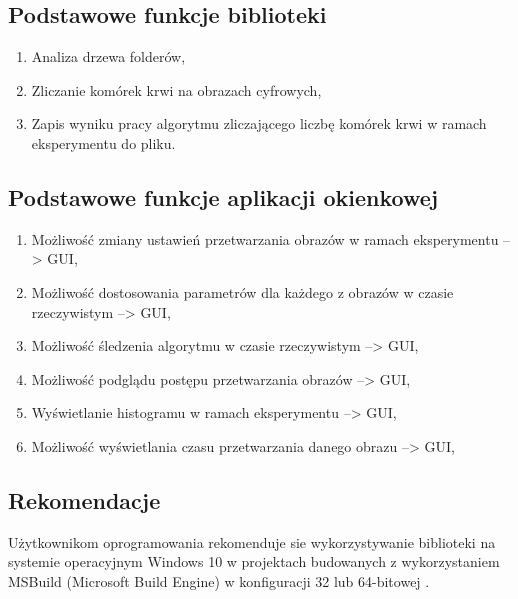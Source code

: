 \documentclass{article}
\begin{document}
        \newpage
        \subsection{Podstawowe funkcje biblioteki}
        {
            \Large
            \quad
            \begin{enumerate}
                \item Analiza drzewa folderów,
                \item Zliczanie komórek krwi na obrazach cyfrowych,
                \item Zapis wyniku pracy algorytmu zliczającego liczbę komórek krwi w ramach eksperymentu do pliku.
            \end{enumerate}
        }

        \subsection{Podstawowe funkcje aplikacji okienkowej}
        {
            \Large
            \quad
            \begin{enumerate}
                \item Możliwość zmiany ustawień przetwarzania obrazów w ramach eksperymentu --> GUI,
                \item Możliwość dostosowania parametrów dla każdego z obrazów w czasie rzeczywistym --> GUI,
                \item Możliwość śledzenia algorytmu w czasie rzeczywistym --> GUI,
                \item Możliwość podglądu postępu przetwarzania obrazów --> GUI,
                \item Wyświetlanie histogramu w ramach eksperymentu --> GUI,
                \item Możliwość wyświetlania czasu przetwarzania danego obrazu --> GUI,
            \end{enumerate}
        }

        \subsection{Rekomendacje}
        {
            \Large
            \justifying
            \quad
            Użytkownikom oprogramowania rekomenduje sie wykorzystywanie biblioteki na systemie operacyjnym Windows 10 w projektach budowanych z wykorzystaniem MSBuild (Microsoft Build Engine) w konfiguracji 32 lub 64-bitowej \cite{msdocsmsbuild}.
        }
\end{document}
